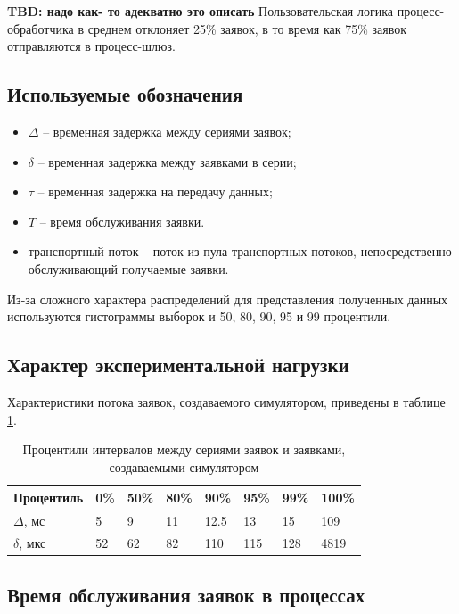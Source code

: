 \textbf{TBD: надо как- то адекватно это описать}
Пользовательская логика процесс-обработчика в среднем отклоняет 25\% заявок, в то время как 75\% заявок отправляются в процесс-шлюз.

\subsection{Используемые обозначения}

\begin{itemize}
\item $\Delta$ -- временная задержка между сериями заявок;
\item $\delta$ -- временная задержка между заявками в серии;
\item $\tau$ -- временная задержка на передачу данных;
\item $T$ -- время обслуживания заявки.
\item транспортный поток -- поток из пула транспортных потоков, непосредственно обслуживающий получаемые заявки.
\end{itemize}

Из-за сложного характера распределений для представления полученных данных используются гистограммы выборок и 50, 80, 90, 95 и 99 процентили.

\subsection{Характер экспериментальной нагрузки}

Характеристики потока заявок, создаваемого симулятором, приведены в таблице \ref{chapter41:TableSimulator}.
\begin{table}[!h]
\caption{Процентили интервалов между сериями заявок и заявками, создаваемыми симулятором}\label{chapter41:TableSimulator}
\centering
\begin{tabular}{|l|l|l|l|l|l|l|l|}
\hline
Процентиль & 0\% & 50\% & 80\% & 90\% & 95\% & 99\% & 100\% \\ \hline
$\Delta$, мс & 5 & 9 & 11 & 12.5 & 13 & 15 & 109 \\ \hline
$\delta$, мкс & 52 & 62 & 82 & 110 & 115 & 128 & 4819 \\ \hline
\end{tabular}
\end{table}

\subsection{Время обслуживания заявок в процессах}

